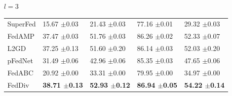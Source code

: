 \documentclass[journal]{IEEEtran}
\begin{document}
\begin{table}
\begin{subtable}[]{$l=3$}
\begin{tabular}{@{}lllll@{}}
			SuperFed & 15.67 $\pm$0.03          & 21.43 $\pm$0.03          & 77.16 $\pm$0.01          & 29.32 $\pm$0.03          \\
			FedAMP   & 37.47 $\pm$0.03          & 51.76 $\pm$0.03          & 86.26 $\pm$0.02          & 52.33 $\pm$0.07          \\
			L2GD     & 37.25 $\pm$0.13          & 51.60 $\pm$0.20          & 86.14 $\pm$0.03          & 52.03 $\pm$0.20          \\
			pFedNet  & 31.49 $\pm$0.06          & 42.96 $\pm$0.06          & 85.35 $\pm$0.03          & 47.65 $\pm$0.06          \\
			FedABC   & 20.92 $\pm$0.00          & 33.31 $\pm$0.00          & 79.95 $\pm$0.00          & 34.97 $\pm$0.00          \\
			FedDiv   & \textbf{38.71 $\pm$0.13} & \textbf{52.93 $\pm$0.12} & \textbf{86.94 $\pm$0.05} & \textbf{54.22 $\pm$0.14} \\ \bottomrule
		\end{tabular}
	\end{subtable}
\end{table}
\end{document}
